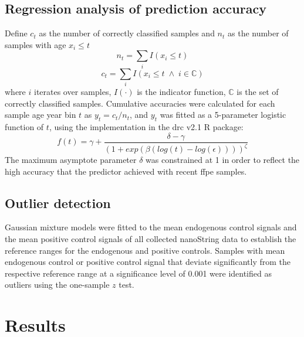 \subsection{Regression analysis of prediction accuracy}

Define $c_t$ as the number of correctly classified samples and $n_t$ as the number of samples with age $x_i \le t$
\[
n_t = \sum_i I(x_i \le t)
\]
\[
c_t = \sum_i I(x_i \le t \; \wedge \; i \in \mathbb{C})
\]
where $i$ iterates over samples, $I(\cdot)$ is the indicator function, $\mathbb{C}$ is the set of correctly classified samples.
Cumulative accuracies were calculated for each sample age year bin $t$ as $y_t = c_t / n_t$, and $y_t$ was fitted as a 5-parameter logistic function of $t$, using the implementation in the drc v2.1 R package:
\[
f(t) = \gamma + \frac{\delta - \gamma}{(1 + exp( \beta (log(t) - log(\epsilon)) ))^\zeta}
\]
The maximum asymptote parameter $\delta$ was constrained at 1 in order to reflect the high accuracy that the predictor achieved with recent \gls{ffpe} samples. 

\subsection{Outlier detection}

Gaussian mixture models were fitted to the mean endogenous control signals and the mean positive control signals of all collected nanoString data to establish the reference ranges for the endogenous and positive controls. Samples with mean endogenous control or positive control signal that deviate significantly from the respective reference range at a significance level of 0.001 were identified as outliers using the one-sample $z$ test.

\section{Results}

